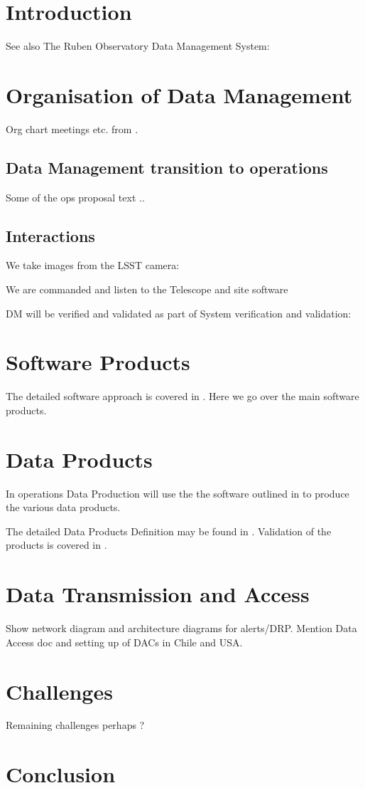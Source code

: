 \section{Introduction}

 See also The Ruben Observatory  Data Management System: \cite{2015arXiv151207914J}






\section{Organisation of Data Management} \label{sec:org}
Org chart meetings etc. from \cite{LDM-294}.
\subsection{ Data Management transition to operations} \label{sec:org}
Some of the ops proposal text ..

\subsection{Interactions}
   We take images from the  LSST camera: \cite{2010SPIE.7735E..0JK}

   We are commanded and listen to the  Telescope  and site software  \cite{2014SPIE.9145E..1AG}


   DM will be verified and validated as part of System verification and validation: \cite{2014SPIE.9150E..0NS}
\section {Software Products} \label{sec:softproduts}
The detailed software approach is covered in \cite{PSTN-019}. Here we go over the main software products.


\section{Data Products} \label{sec:dataproducts}
In operations Data Production will use the the software outlined in  to produce the various data products.

 The detailed  Data Products Definition may be found in  \cite{LSE-163}.
Validation of the products is covered in \cite{PSTN-024}.


\section {Data Transmission and  Access } \label{sec:dataacess}
Show network diagram and architecture diagrams for alerts/DRP. Mention Data Access doc  \cite{LDO-013} and
setting up of DACs in Chile and USA.

\section {Challenges }
Remaining challenges perhaps ?

\section{Conclusion}
